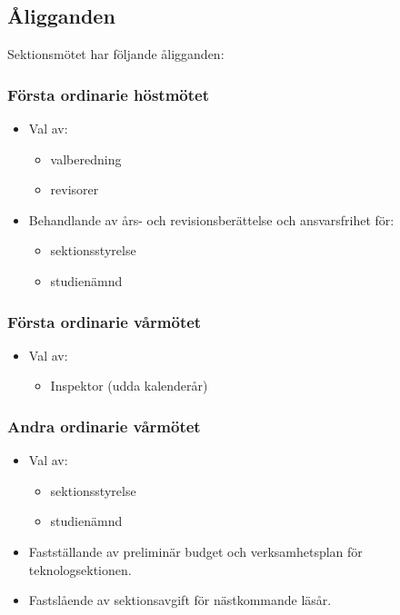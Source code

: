 \subsection{Åligganden}
Sektionsmötet har följande åligganden:
\subsubsection{Första ordinarie höstmötet}
\begin{itemize}
	\item Val av: 
	\begin{itemize}
		\item valberedning
		\item revisorer
	\end{itemize}
	\item Behandlande av års- och revisionsberättelse och ansvarsfrihet för:
	\begin{itemize}
		\item sektionsstyrelse
		\item studienämnd
	\end{itemize}
\end{itemize}
	
\subsubsection{Första ordinarie vårmötet}
\begin{itemize}
	\item Val av: 
	\begin{itemize}
		\item Inspektor (udda kalenderår)
	\end{itemize}
\end{itemize}


\subsubsection{Andra ordinarie vårmötet}
\begin{itemize}
	\item Val av: 
	\begin{itemize}
		\item sektionsstyrelse
		\item studienämnd
	\end{itemize}
	\item Fastställande av preliminär budget och verksamhetsplan för teknologsektionen.
	\item Fastslående av sektionsavgift för nästkommande läsår.
\end{itemize}

